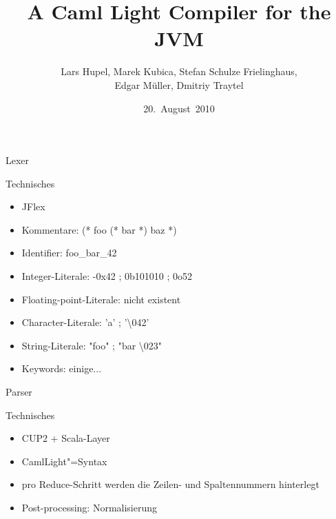 \documentclass[hyperref={pdfpagelabels=false}]{beamer}
\title{A Caml Light Compiler for the JVM}
\author[Hupel, Kubica, Schulze Frielinghaus, Müller, Traytel]{Lars Hupel, Marek Kubica, Stefan Schulze Frielinghaus, \\Edgar Müller, Dmitriy Traytel}
\institute{TU~München}
\date{20.~August~2010}
\begin{document}
\frame{\titlepage}


\begin{frame}{Lexer}
  \begin{block}{Technisches}
    \begin{itemize}
      \item JFlex
      \item Kommentare: (* foo (* bar *) baz *)
      \item Identifier: foo\_bar\_42
      \item Integer-Literale: -0x42 ; 0b101010 ; 0o52
      \item Floating-point-Literale: nicht existent
      \item Character-Literale: 'a' ; '\textbackslash 042'
      \item String-Literale: "foo" ; "bar \textbackslash 023"
      \item Keywords: einige...
    \end{itemize}
  \end{block}
\end{frame}

\begin{frame}{Parser}
  \begin{block}{Technisches}
    \begin{itemize}
      \item CUP2 + Scala-Layer
      \item CamlLight"=Syntax
      \item pro Reduce-Schritt werden die Zeilen- und Spaltennummern hinterlegt
      \item Post-processing: Normalisierung
    \end{itemize}
  \end{block}
\end{frame}
\end{document}
